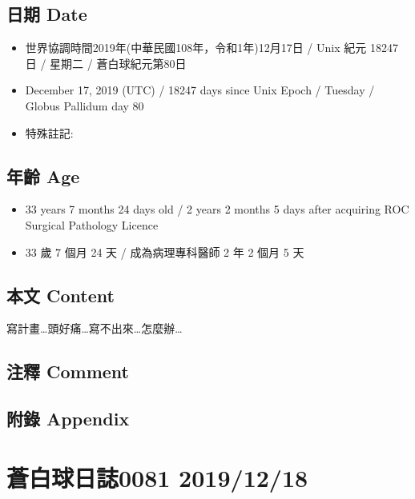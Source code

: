 \documentclass[a5paper, 12pt
]{book}
\providecommand{\tightlist}{%
  \setlength{\itemsep}{0pt}\setlength{\parskip}{0pt}}
\begin{document}
\hypertarget{ux65e5ux671f-date-16}{%
\subsection{日期 Date}\label{ux65e5ux671f-date-16}}

\begin{itemize}
\tightlist
\item
  世界協調時間2019年(中華民國108年，令和1年)12月17日 / Unix 紀元 18247
  日 / 星期二 / 蒼白球紀元第80日
\item
  December 17, 2019 (UTC) / 18247 days since Unix Epoch / Tuesday /
  Globus Pallidum day 80
\item
  特殊註記:
\end{itemize}

\hypertarget{ux5e74ux9f61-age-16}{%
\subsection{年齡 Age}\label{ux5e74ux9f61-age-16}}

\begin{itemize}
\tightlist
\item
  33 years 7 months 24 days old / 2 years 2 months 5 days after
  acquiring ROC Surgical Pathology Licence
\item
  33 歲 7 個月 24 天 / 成為病理專科醫師 2 年 2 個月 5 天
\end{itemize}

\hypertarget{ux672cux6587-content-16}{%
\subsection{本文 Content}\label{ux672cux6587-content-16}}

寫計畫\ldots 頭好痛\ldots 寫不出來\ldots 怎麼辦\ldots{}

\hypertarget{ux6ce8ux91cb-comment-15}{%
\subsection{注釋 Comment}\label{ux6ce8ux91cb-comment-15}}

\hypertarget{ux9644ux9304-appendix-16}{%
\subsection{附錄 Appendix}\label{ux9644ux9304-appendix-16}}

\hypertarget{ux84bcux767dux7403ux65e5ux8a8c0081-20191218}{%
\section{蒼白球日誌0081
2019/12/18}\label{ux84bcux767dux7403ux65e5ux8a8c0081-20191218}}
\end{document}
